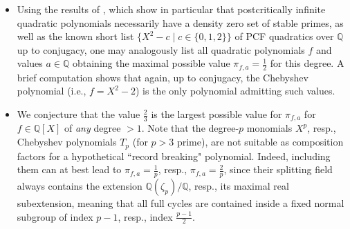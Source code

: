 \documentclass[a4paper]{amsart}
\begin{document}
  \begin{remark}
  \begin{itemize}
  \item[a)] Using the results of \cite{MOS}, which show in particular that postcritically infinite quadratic polynomials necessarily have a density zero set of stable primes, as well as the known short list $\{X^2-c\mid c\in \{0,1,2\}\}$ of PCF quadratics over $\mathbb{Q}$ up to conjugacy, 
  one may analogously list all quadratic polynomials $f$ and values $a\in \mathbb{Q}$ obtaining the maximal possible value $\pi_{f,a}=\frac{1}{2}$ for this degree. A brief computation shows that again, up to conjugacy, the Chebyshev polynomial (i.e., $f=X^2-2$) is the only polynomial admitting such values.
  \item[b)] We conjecture that the value $\frac{2}{3}$ is the largest possible value for $\pi_{f,a}$ for $f\in \mathbb{Q}[X]$ of {\it any} degree $>1$. Note that the degree-$p$ monomials $X^p$, resp., Chebyshev polynomials $T_p$ (for $p>3$ prime), are not suitable as composition factors for a hypothetical ``record breaking" polynomial. Indeed, including them can at best lead to $\pi_{f,a}=\frac{1}{p}$, resp., $\pi_{f,a}=\frac{2}{p}$, since their splitting field  always contains the extension $\mathbb{Q}(\zeta_p)/\mathbb{Q}$, resp., its maximal real subextension, meaning that all full cycles are contained inside a fixed normal subgroup of index $p-1$, resp., index $\frac{p-1}{2}$.
  \end{itemize}
  \end{remark}
  
\end{document}
